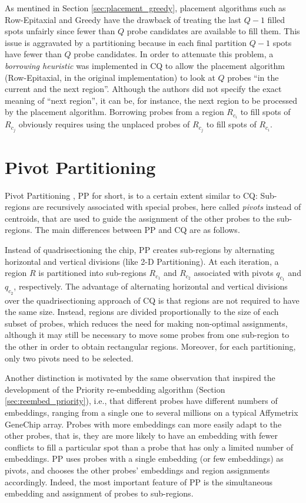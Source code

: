 As mentined in Section \ref{sec:placement_greedy}, placement algorithms such as
Row-Epitaxial and Greedy have the drawback of treating the last $Q - 1$ filled
spots unfairly since fewer than $Q$ probe candidates are available to fill them.
This issue is aggravated by a partitioning because in each final partition
$Q - 1$ spots have fewer than $Q$ probe candidates. In order to attenuate this
problem, a \emph{borrowing heuristic} was implemented in CQ to allow the
placement algorithm (Row-Epitaxial, in the original implementation) to look at
$Q$ probes ``in the current and the next region''. Although the authors did not
specify the exact meaning of ``next region'', it can be, for instance, the next
region to be processed by the placement algorithm. Borrowing probes from a
region $R_{c_i}$ to fill spots of $R_{c_j}$ obviously requires using the
unplaced probes of $R_{c_j}$ to fill spots of $R_{c_i}$.

\section{Pivot Partitioning}
\label{sec:part_pp}

Pivot Partitioning \citep{Carvalho2006}, PP for short, is to a certain extent
similar to CQ: Sub-regions are recursively associated with special probes, here
called \emph{pivots} instead of centroids, that are used to guide the assignment
of the other probes to the sub-regions. The main differences between PP and CQ
are as follows.

Instead of quadrisectioning the chip, PP creates sub-regions by alternating
horizontal and vertical divisions (like 2-D Partitioning). At each iteration, a
region $R$ is partitioned into sub-regions $R_{c_1}$ and $R_{c_2}$ associated
with pivots $q_{c_1}$ and $q_{c_2}$, respectively. The advantage of alternating
horizontal and vertical divisions over the quadrisectioning approach of CQ is
that regions are not required to have the same size. Instead, regions are
divided proportionally to the size of each subset of probes, which reduces the
need for making non-optimal assignments, although it may still be necessary to
move some probes from one sub-region to the other in order to obtain rectangular
regions. Moreover, for each partitioning, only two pivots need to be selected.

Another distinction is motivated by the same observation that inspired the
development of the Priority re-embedding algorithm (Section
\ref{sec:reembed_priority}), i.e., that different probes have different numbers
of embeddings, ranging from a single one to several millions on a typical
Affymetrix GeneChip array. Probes with more embeddings can more easily adapt to
the other probes, that is, they are more likely to have an embedding with fewer
conflicts to fill a particular spot than a probe that has only a limited number
of embeddings. PP uses probes with a single embedding (or few embeddings) as
pivots, and chooses the other probes' embeddings and region assignments
accordingly. Indeed, the most important feature of PP is the simultaneous
embedding and assignment of probes to sub-regions.

